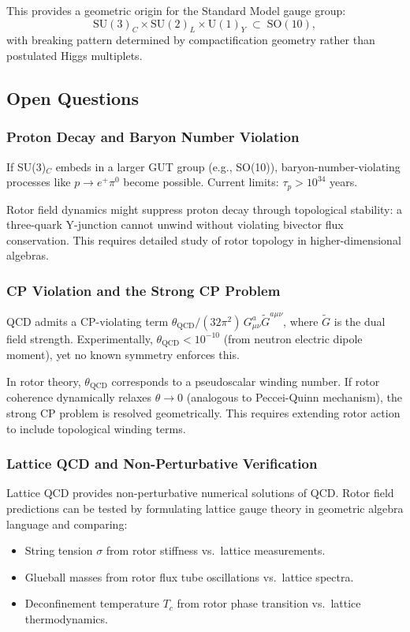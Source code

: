 \documentclass[11pt,a4paper]{article}
\newcommand{\SU}{\mathrm{SU}}
\newcommand{\U}{\mathrm{U}}
\newcommand{\SO}{\mathrm{SO}}
\theoremstyle{definition}
\theoremstyle{plain}
\theoremstyle{remark}
\begin{document}
This provides a geometric origin for the Standard Model gauge group:
\begin{equation}
\SU(3)_C \times \SU(2)_L \times \U(1)_Y \;\subset\; \SO(10),
\end{equation}
with breaking pattern determined by compactification geometry rather than postulated Higgs multiplets.

\subsection{Open Questions}

\subsubsection{Proton Decay and Baryon Number Violation}

If SU(3)$_C$ embeds in a larger GUT group (e.g., SO(10)), baryon-number-violating processes like $p \to e^+ \pi^0$ become possible. Current limits: $\tau_p > 10^{34}$ years.

Rotor field dynamics might suppress proton decay through topological stability: a three-quark Y-junction cannot unwind without violating bivector flux conservation. This requires detailed study of rotor topology in higher-dimensional algebras.

\subsubsection{CP Violation and the Strong CP Problem}

QCD admits a CP-violating term $\theta_{\mathrm{QCD}}/(32\pi^2)\,G_{\mu\nu}^a \tilde{G}^{a\mu\nu}$, where $\tilde{G}$ is the dual field strength. Experimentally, $\theta_{\mathrm{QCD}} < 10^{-10}$ (from neutron electric dipole moment), yet no known symmetry enforces this.

In rotor theory, $\theta_{\mathrm{QCD}}$ corresponds to a pseudoscalar winding number. If rotor coherence dynamically relaxes $\theta \to 0$ (analogous to Peccei-Quinn mechanism), the strong CP problem is resolved geometrically. This requires extending rotor action to include topological winding terms.

\subsubsection{Lattice QCD and Non-Perturbative Verification}

Lattice QCD provides non-perturbative numerical solutions of QCD. Rotor field predictions can be tested by formulating lattice gauge theory in geometric algebra language and comparing:
\begin{itemize}
  \item String tension $\sigma$ from rotor stiffness vs.\ lattice measurements.
  \item Glueball masses from rotor flux tube oscillations vs.\ lattice spectra.
  \item Deconfinement temperature $T_c$ from rotor phase transition vs.\ lattice thermodynamics.
\end{itemize}
\end{document}

